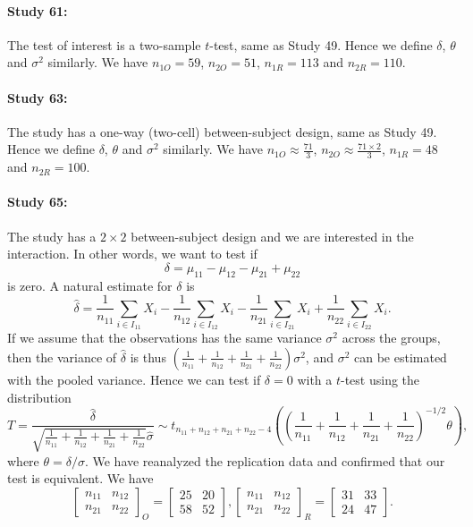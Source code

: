 \documentclass[11pt]{article}
\theoremstyle{definition}
\theoremstyle{custom}
\newcommand{\hdelta}{\hat{\delta}}
\newcommand{\hsigma}{\hat{\sigma}}
\begin{document}
  \paragraph{Study 61: \citet{ErsnerHershfield:2008dt}}
  The test of interest is a two-sample $t$-test, same as Study 49. Hence we define $\delta$, $\theta$ and $\sigma^2$ similarly. We have $n_{1O} = 59$, $n_{2O} = 51$, $n_{1R} = 113$ and $n_{2R} = 110$.

  \paragraph{Study 63: \citet{Correll:2008cj}}
  The study has a one-way (two-cell) between-subject design, same as Study 49. Hence we define $\delta$, $\theta$ and $\sigma^2$ similarly. We have $n_{1O} \approx \frac{71}{3}$, $n_{2O} \approx \frac{71 \times 2}{3}$, $n_{1R} = 48$ and $n_{2R} = 100$.

  \paragraph{Study 65: \citet{Exline:2008dj}}
  The study has a $2 \times 2$ between-subject design and we are interested in the interaction. In other words, we want to test if
  \[
  \delta = \mu_{11} - \mu_{12} - \mu_{21} + \mu_{22}
  \]
  is zero. A natural estimate for $\delta$ is
  \[
  \hdelta = \frac{1}{n_{11}} \sum_{i \in I_{11}} X_i - \frac{1}{n_{12}} \sum_{i \in I_{12}} X_i - \frac{1}{n_{21}} \sum_{i \in I_{21}} X_i + \frac{1}{n_{22}} \sum_{i \in I_{22}} X_i.
  \]
  If we assume that the observations has the same variance $\sigma^2$ across the groups, then the variance of $\hdelta$ is thus $(\frac{1}{n_{11}} + \frac{1}{n_{12}} + \frac{1}{n_{21}} + \frac{1}{n_{22}}) \sigma^2$, and $\sigma^2$ can be estimated with the pooled variance. Hence we can test if $\delta = 0$ with a $t$-test using the distribution
  \[
  T = \frac{\hdelta}{\sqrt{\frac{1}{n_{11}} + \frac{1}{n_{12}} + \frac{1}{n_{21}} + \frac{1}{n_{22}}} \hsigma} \sim t_{n_{11} + n_{12} + n_{21} + n_{22} - 4}\left(\left(\frac{1}{n_{11}} + \frac{1}{n_{12}} + \frac{1}{n_{21}} + \frac{1}{n_{22}}\right)^{-1/2} \theta\right),
  \]
  where $\theta = \delta / \sigma$. We have reanalyzed the replication data and confirmed that our test is equivalent. We have
  \[
  \begin{bmatrix}
  n_{11} & n_{12} \\
  n_{21} & n_{22}
  \end{bmatrix}_O = \begin{bmatrix}
  25 & 20 \\
  58 & 52
  \end{bmatrix}, \begin{bmatrix}
  n_{11} & n_{12} \\
  n_{21} & n_{22}
  \end{bmatrix}_R = \begin{bmatrix}
  31 & 33 \\
  24 & 47
  \end{bmatrix}.
  \]
\end{document}
